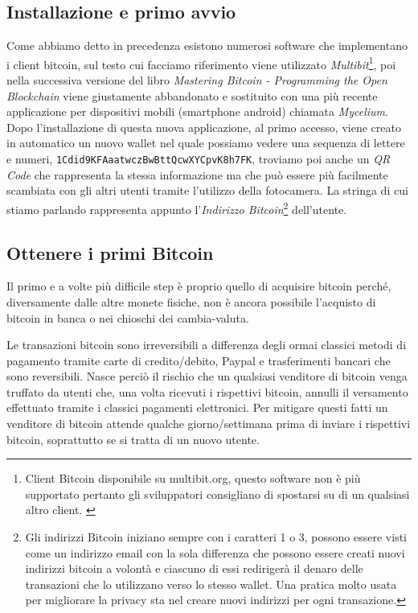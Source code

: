 \subsection*{Installazione e primo avvio}
Come abbiamo detto in precedenza esistono numerosi software che implementano i client bitcoin, sul testo cui facciamo riferimento \cite{mastering:andreas} viene utilizzato \textit{Multibit}\footnote{Client Bitcoin disponibile su multibit.org, questo software non è più supportato pertanto gli sviluppatori consigliano di spostarsi su di un qualsiasi altro client. \cite{multibit-software}}, poi nella successiva versione del libro \textit{Mastering Bitcoin - Programming the Open Blockchain}\cite{mastering2:andreas} viene giustamente abbandonato e sostituito con una più recente applicazione per dispositivi mobili (smartphone android) chiamata \textit{Mycelium}. Dopo l'installazione di questa nuova applicazione, al primo accesso, viene creato in automatico un nuovo wallet nel quale possiamo vedere una sequenza di lettere e numeri, \texttt{1Cdid9KFAaatwczBwBttQcwXYCpvK8h7FK}, troviamo poi anche un \textit{QR Code} che rappresenta la stessa informazione ma che può essere più facilmente scambiata con gli altri utenti tramite l'utilizzo della fotocamera. La stringa di cui stiamo parlando rappresenta appunto l'\textit{Indirizzo Bitcoin}\footnote{Gli indirizzi Bitcoin iniziano sempre con i caratteri 1 o 3, possono essere visti come un indirizzo email con la sola differenza che possono essere creati nuovi indirizzi bitcoin a volontà e ciascuno di essi redirigerà il denaro delle transazioni che lo utilizzano verso lo stesso wallet. Una pratica molto usata per migliorare la privacy sta nel creare nuovi indirizzi per ogni transazione.} dell'utente.

\subsection*{Ottenere i primi Bitcoin}
Il primo e a volte più difficile step è proprio quello di acquisire bitcoin perché, diversamente dalle altre monete fisiche, non è ancora possibile l'acquisto di bitcoin in banca o nei chioschi dei cambia-valuta. 

Le transazioni bitcoin sono irreversibili a differenza degli ormai classici metodi di pagamento tramite carte di credito/debito, Paypal e trasferimenti bancari che sono reversibili. Nasce perciò il rischio che un qualsiasi venditore di bitcoin venga truffato da utenti che, una volta ricevuti i rispettivi bitcoin, annulli il versamento effettuato tramite i classici pagamenti elettronici. Per mitigare questi fatti un venditore di bitcoin attende qualche giorno/settimana prima di inviare i rispettivi bitcoin, soprattutto se si tratta di un nuovo utente. 

